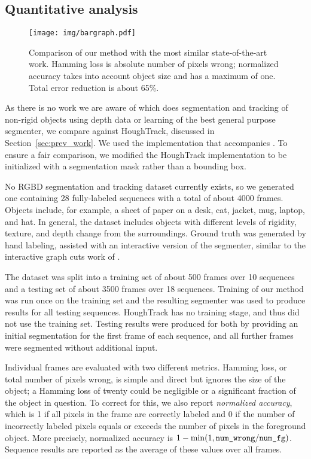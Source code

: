\documentclass[journal]{IEEEtran}
\renewcommand{\todo}[1]{}
\begin{document}
\subsection{Quantitative analysis}
\label{sec:quant}

\begin{figure*}
  \centering
  \texttt{[image: img/bargraph.pdf]}
  \caption{Comparison of our method with the most similar state-of-the-art work.  Hamming loss is absolute number of pixels wrong; normalized accuracy takes into account object size and has a maximum of one.  Total error reduction is about 65\%.}
  \label{fig:bargraph}
  \vspace{50pt}
\end{figure*}

As there is no work we are aware of which does segmentation and tracking of non-rigid objects using depth data or learning of the best general purpose segmenter, we compare against HoughTrack, discussed in Section~\ref{sec:prev_work}.  We used the implementation that accompanies \cite{godec2011a}.  To ensure a fair comparison, we modified the HoughTrack implementation to be initialized with a segmentation mask rather than a bounding box.

No RGBD segmentation and tracking dataset currently exists, so we generated one containing 28 fully-labeled sequences with a total of about 4000 frames. Objects include, for example, a sheet of paper on a desk, cat, jacket, mug, laptop, and hat. In general, the dataset includes objects with different levels of rigidity, texture, and depth change from the surroundings. \todo{what is the right word for this?  \ie a poster flush to the wall vs a mug sticking up out of the desk} Ground truth was generated by hand labeling, assisted with an interactive version of the segmenter, similar to the interactive graph cuts work of \cite{boykov2001a}.

The dataset was split into a training set of about 500 frames over 10 sequences and a testing set of about 3500 frames over 18 sequences.  Training of our method was run once on the training set and the resulting segmenter was used to produce results for all testing sequences. HoughTrack has no training stage, and thus did not use the training set.  Testing results were produced for both by providing an initial segmentation for the first frame of each sequence, and all further frames were segmented without additional input.

Individual frames are evaluated with two different metrics.  Hamming loss, or total number of pixels wrong, is simple and direct but ignores the size of the object; a Hamming loss of twenty could be negligible or a significant fraction of the object in question.  To correct for this, we also report \emph{normalized accuracy}, which is 1 if all pixels in the frame are correctly labeled and 0 if the number of incorrectly labeled pixels equals or exceeds the number of pixels in the foreground object.  More precisely, normalized accuracy is $1 - \min(1, \mbox{\texttt{num\_wrong}} / \mbox{\texttt{num\_fg}})$.  Sequence results are reported as the average of these values over all frames.
\end{document}
